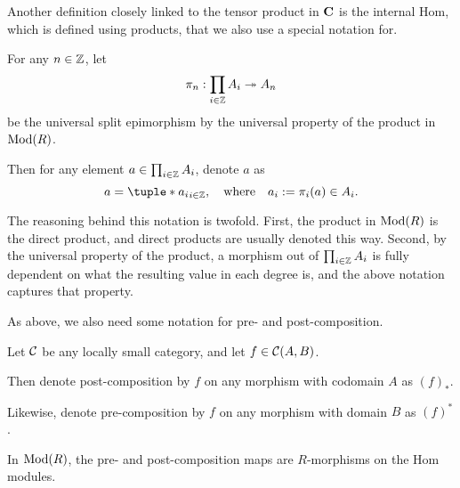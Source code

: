 Another definition closely linked to the tensor product in \( \operatorname{\mathbf{C}} \) is the internal Hom, which is defined using products, that we also use a special notation for.
\begin{notation}
    \label{not:prod}
    For any \( n \in {\mathbb{Z}} \), let 
    \[
        \pi_n: \prod_{i \in {\mathbb{Z}}} A_i \twoheadrightarrow A_n
    \]
    be the universal split epimorphism by the universal property of the product in \( \operatorname{Mod}(R) \).
    
    Then for any element \( a \in \prod_{i \in {\mathbb{Z}}} A_i \), denote \( a \) as
    \[
        a = \tuple*{a_i}_{i \in \Zb}, \quad \text{where} \quad a_i := \pi_i(a) \in A_i.
    \]
\end{notation}

The reasoning behind this notation is twofold. First, the product in \( \operatorname{Mod}(R) \) is the direct product, and direct products are usually denoted this way. Second, by the universal property of the product, a morphism out of \( \prod_{i \in {\mathbb{Z}}} A_i \) is fully dependent on what the resulting value in each degree is, and the above notation captures that property.

As above, we also need some notation for pre- and post-composition.
\begin{notation}
    Let \( {\mathcal{C}} \) be any locally small category, and let \( f \in {\mathcal{C}}(A, B) \).

    Then denote post-composition by \( f \) on any morphism with codomain \( A \) as \( (f)_* \).

    Likewise, denote pre-composition by \( f \) on any morphism with domain \( B \) as \( (f)^* \).
\end{notation}
In \( \operatorname{Mod}(R) \), the pre- and post-composition maps are \( R \)-morphisms on the Hom modules.

